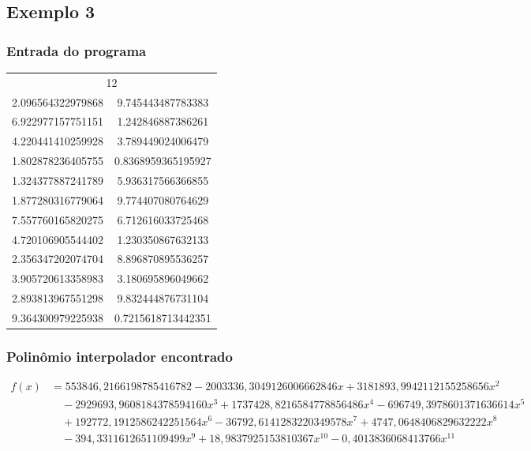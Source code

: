 \documentclass{article}
\begin{document}
        \subsection{Exemplo 3}

                \subsubsection{Entrada do programa}
                    \begin{table}[ht!]
                        \centering
                        \begin{tabular}{cc}
                            \multicolumn{2}{c}{12} \\
                            2.096564322979868  & 9.745443487783383 \\
                            6.922977157751151  & 1.242846887386261 \\
                            4.220441410259928  & 3.789449024006479 \\
                            1.802878236405755  & 0.8368959365195927 \\
                            1.324377887241789  & 5.936317566366855 \\
                            1.877280316779064  & 9.774407080764629 \\
                            7.557760165820275  & 6.712616033725468 \\
                            4.720106905544402  & 1.230350867632133 \\
                            2.356347202074704  & 8.896870895536257 \\
                            3.905720613358983  & 3.180695896049662 \\
                            2.893813967551298  & 9.832444876731104 \\
                            9.364300979225938  & 0.7215618713442351 \\
                        \end{tabular}
                    \end{table}
                
                \subsubsection{Polinômio interpolador encontrado}
                    \begin{align*}
                    f(x) &= 553846{,}2166198785416782 - 2003336{,}3049126006662846x + 3181893{,}9942112155258656x^2 \\
                        &\quad - 2929693{,}9608184378594160x^3 + 1737428{,}8216584778856486x^4 - 696749{,}3978601371636614x^5 \\
                        &\quad + 192772{,}1912586242251564x^6 - 36792{,}6141283220349578x^7 + 4747{,}0648406829632222x^8 \\
                        &\quad - 394{,}3311612651109499x^9 + 18{,}9837925153810367x^{10} - 0{,}4013836068413766x^{11}
                    \end{align*}
\end{document}
